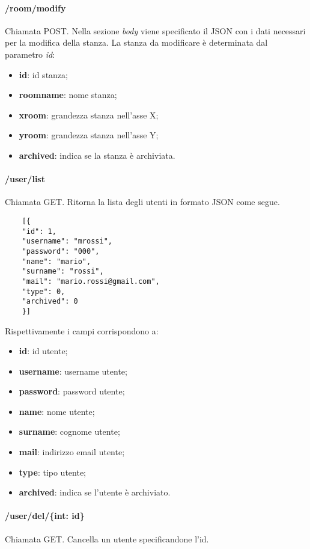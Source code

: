\paragraph{/room/modify}
Chiamata POST. Nella sezione \textit{body} viene specificato il JSON con i dati necessari per la modifica della stanza. La stanza da modificare è determinata dal parametro \textit{id}:
\begin{itemize}
	\item \textbf{id}: id stanza;
	\item \textbf{roomname}: nome stanza;
	\item \textbf{xroom}: grandezza stanza nell'asse X;
	\item \textbf{yroom}: grandezza stanza nell'asse Y;
	\item \textbf{archived}: indica se la stanza è archiviata.	
\end{itemize}
\paragraph{/user/list}
Chiamata GET. Ritorna la lista degli utenti in formato JSON come segue.	\\
\begin{center}
	\begin{lstlisting}
	[{
	"id": 1,
	"username": "mrossi",
	"password": "000",
	"name": "mario",
	"surname": "rossi",
	"mail": "mario.rossi@gmail.com",
	"type": 0,
	"archived": 0
	}]
	\end{lstlisting}
\end{center}
Rispettivamente i campi corrispondono a:
\begin{itemize}
	\item \textbf{id}: id utente;
	\item \textbf{username}: username utente;
	\item \textbf{password}: password utente;
	\item \textbf{name}: nome utente;
	\item \textbf{surname}: cognome utente;	
	\item \textbf{mail}: indirizzo email utente;	
	\item \textbf{type}: tipo utente;	
	\item \textbf{archived}: indica se l'utente è archiviato.	
\end{itemize}
\paragraph{/user/del/\{int: id\}}
Chiamata GET. Cancella un utente specificandone l'id.
